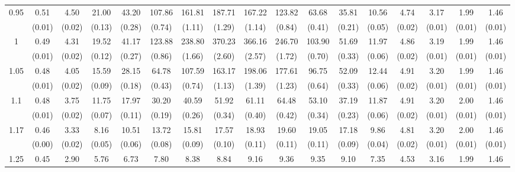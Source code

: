 \documentclass[12pt]{article}  %
\theoremstyle{plain}
\begin{document}
\begin{sidewaystable}[htbp]
\begin{tabular}{ccccccccccccccccc}
\multirow{2}{*}{0.95}  &0.51& 4.50& 21.00& 43.20 &107.86& 161.81& 187.71 &167.22 &123.82 & 63.68 &35.81& 10.56 & 4.74 & 3.17  &1.99  &1.46\\                
					  & (0.01)&  (0.02)& (0.13)& (0.28)& (0.74)& (1.11)& (1.29)& (1.14)& (0.84)&  (0.41)&  (0.21)&  (0.05)&  (0.02)& (0.01)& (0.01)& (0.01)\\ \hline
\multirow{2}{*}{1}  &  0.49& 4.31&19.52 &41.17 &123.88 &238.80& 370.23 &366.16 &246.70 &103.90 &51.69 &11.97 & 4.86&  3.19 & 1.99 & 1.46\\
                      & (0.01)& (0.02)& (0.12)& (0.27)& (0.86)& (1.66)& (2.60)& (2.57)& (1.72)&  (0.70)&  (0.33)&  (0.06)&  (0.02) & (0.01)& (0.01)& (0.01)\\ \hline                                                                     
\multirow{2}{*}{1.05}  & 0.48& 4.05& 15.59& 28.15 & 64.78& 107.59& 163.17& 198.06& 177.61 & 96.75& 52.09 &12.44 & 4.91 & 3.20 & 1.99 & 1.46\\
                      & (0.01)&   (0.02)& (0.09)& (0.18)& (0.43)& (0.74)& (1.13)& (1.39)& (1.23)&  (0.64)&  (0.33)&  (0.06)&  (0.02)& (0.01)& (0.01)& (0.01)\\ \hline                                                                                                                                          
\multirow{2}{*}{1.1}  &0.48& 3.75& 11.75& 17.97 & 30.20&  40.59 & 51.92 & 61.11&  64.48 & 53.10& 37.19& 11.87&  4.91 & 3.20 & 2.00 & 1.46\\
                      &  (0.01)&   (0.02)& (0.07)& (0.11)& (0.19)& (0.26)& (0.34)& (0.40)& (0.42)&  (0.34)&  (0.23)&  (0.06)&  (0.02)& (0.01)& (0.01)& (0.01)\\ \hline
\multirow{2}{*}{1.17}  & 0.46& 3.33 & 8.16& 10.51 & 13.72 & 15.81 & 17.57 & 18.93 & 19.60 & 19.05 &17.18 & 9.86 & 4.81 & 3.20 & 2.00 & 1.46\\
                      & (0.00)&   (0.02)& (0.05)& (0.06)& (0.08)& (0.09)& (0.10)& (0.11)& (0.11)&  (0.11)&  (0.09)&  (0.04)&  (0.02)& (0.01)& (0.01)& (0.01)\\ \hline                                                                                                                                                                                                                                                                                    
                                                                     \multirow{2}{*}{1.25}  &0.45& 2.90 & 5.76 & 6.73 &  7.80  & 8.38  & 8.84  & 9.16 &  9.36 &  9.35 & 9.10 & 7.35 & 4.53 & 3.16&  1.99 & 1.46\\

\end{tabular}
\end{sidewaystable}
\end{document}
